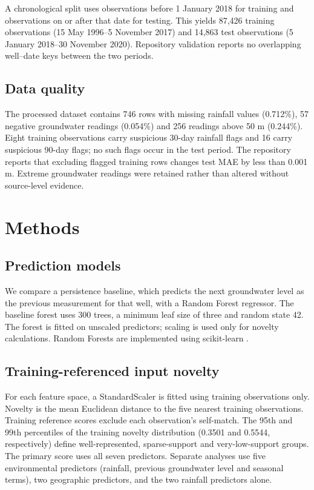 \documentclass[conference]{IEEEtran}
\begin{document}
A chronological split uses observations before 1 January 2018 for training and observations on or after that date for testing. This yields 87,426 training observations (15 May 1996--5 November 2017) and 14,863 test observations (5 January 2018--30 November 2020). Repository validation reports no overlapping well--date keys between the two periods.

\subsection{Data quality}
The processed dataset contains 746 rows with missing rainfall values (0.712\%), 57 negative groundwater readings (0.054\%) and 256 readings above 50 m (0.244\%). Eight training observations carry suspicious 30-day rainfall flags and 16 carry suspicious 90-day flags; no such flags occur in the test period. The repository reports that excluding flagged training rows changes test MAE by less than 0.001 m. Extreme groundwater readings were retained rather than altered without source-level evidence.

\section{Methods}
\subsection{Prediction models}
We compare a persistence baseline, which predicts the next groundwater level as the previous measurement for that well, with a Random Forest regressor. The baseline forest uses 300 trees, a minimum leaf size of three and random state 42. The forest is fitted on unscaled predictors; scaling is used only for novelty calculations. Random Forests are implemented using scikit-learn \cite{pedregosa}.

\subsection{Training-referenced input novelty}
For each feature space, a StandardScaler is fitted using training observations only. Novelty is the mean Euclidean distance to the five nearest training observations. Training reference scores exclude each observation's self-match. The 95th and 99th percentiles of the training novelty distribution (0.3501 and 0.5544, respectively) define well-represented, sparse-support and very-low-support groups. The primary score uses all seven predictors. Separate analyses use five environmental predictors (rainfall, previous groundwater level and seasonal terms), two geographic predictors, and the two rainfall predictors alone.
\end{document}
